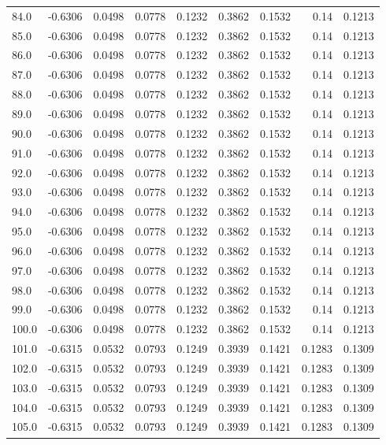 \begin{longtable}{lrrrrrrrr}
84.0 & -0.6306 & 0.0498 & 0.0778 & 0.1232 & 0.3862 & 0.1532 & 0.14 & 0.1213 \\
85.0 & -0.6306 & 0.0498 & 0.0778 & 0.1232 & 0.3862 & 0.1532 & 0.14 & 0.1213 \\
86.0 & -0.6306 & 0.0498 & 0.0778 & 0.1232 & 0.3862 & 0.1532 & 0.14 & 0.1213 \\
87.0 & -0.6306 & 0.0498 & 0.0778 & 0.1232 & 0.3862 & 0.1532 & 0.14 & 0.1213 \\
88.0 & -0.6306 & 0.0498 & 0.0778 & 0.1232 & 0.3862 & 0.1532 & 0.14 & 0.1213 \\
89.0 & -0.6306 & 0.0498 & 0.0778 & 0.1232 & 0.3862 & 0.1532 & 0.14 & 0.1213 \\
90.0 & -0.6306 & 0.0498 & 0.0778 & 0.1232 & 0.3862 & 0.1532 & 0.14 & 0.1213 \\
91.0 & -0.6306 & 0.0498 & 0.0778 & 0.1232 & 0.3862 & 0.1532 & 0.14 & 0.1213 \\
92.0 & -0.6306 & 0.0498 & 0.0778 & 0.1232 & 0.3862 & 0.1532 & 0.14 & 0.1213 \\
93.0 & -0.6306 & 0.0498 & 0.0778 & 0.1232 & 0.3862 & 0.1532 & 0.14 & 0.1213 \\
94.0 & -0.6306 & 0.0498 & 0.0778 & 0.1232 & 0.3862 & 0.1532 & 0.14 & 0.1213 \\
95.0 & -0.6306 & 0.0498 & 0.0778 & 0.1232 & 0.3862 & 0.1532 & 0.14 & 0.1213 \\
96.0 & -0.6306 & 0.0498 & 0.0778 & 0.1232 & 0.3862 & 0.1532 & 0.14 & 0.1213 \\
97.0 & -0.6306 & 0.0498 & 0.0778 & 0.1232 & 0.3862 & 0.1532 & 0.14 & 0.1213 \\
98.0 & -0.6306 & 0.0498 & 0.0778 & 0.1232 & 0.3862 & 0.1532 & 0.14 & 0.1213 \\
99.0 & -0.6306 & 0.0498 & 0.0778 & 0.1232 & 0.3862 & 0.1532 & 0.14 & 0.1213 \\
100.0 & -0.6306 & 0.0498 & 0.0778 & 0.1232 & 0.3862 & 0.1532 & 0.14 & 0.1213 \\
101.0 & -0.6315 & 0.0532 & 0.0793 & 0.1249 & 0.3939 & 0.1421 & 0.1283 & 0.1309 \\
102.0 & -0.6315 & 0.0532 & 0.0793 & 0.1249 & 0.3939 & 0.1421 & 0.1283 & 0.1309 \\
103.0 & -0.6315 & 0.0532 & 0.0793 & 0.1249 & 0.3939 & 0.1421 & 0.1283 & 0.1309 \\
104.0 & -0.6315 & 0.0532 & 0.0793 & 0.1249 & 0.3939 & 0.1421 & 0.1283 & 0.1309 \\
105.0 & -0.6315 & 0.0532 & 0.0793 & 0.1249 & 0.3939 & 0.1421 & 0.1283 & 0.1309 \\

\end{longtable}
